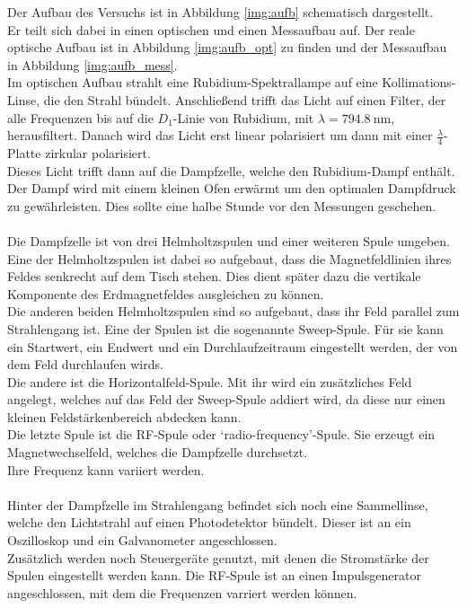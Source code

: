 \noindent
Der Aufbau des Versuchs ist in Abbildung \ref{img:aufb} schematisch dargestellt.\\
Er teilt sich dabei in einen optischen und einen Messaufbau auf. Der reale optische Aufbau ist in Abbildung
\ref{img:aufb_opt} zu finden und der Messaufbau in Abbildung \ref{img:aufb_mess}.\\
Im optischen Aufbau strahlt eine Rubidium-Spektrallampe auf eine Kollimations-Linse, die den Strahl bündelt.
Anschließend trifft das Licht auf einen Filter, der alle Frequenzen bis auf die $D_1$-Linie von Rubidium, 
mit $\lambda = \SI{794.8}{\nano\metre}$, herausfiltert. Danach wird das Licht erst linear polarisiert um dann mit einer $\frac{\lambda}{4}$-Platte zirkular polarisiert.\\
Dieses Licht trifft dann auf die Dampfzelle, welche den Rubidium-Dampf enthält. 
Der Dampf wird mit einem kleinen Ofen erwärmt um den optimalen Dampfdruck zu gewährleisten.
Dies sollte eine halbe Stunde vor den Messungen geschehen.\\\\
Die Dampfzelle ist von drei Helmholtzspulen und einer weiteren Spule umgeben.\\
Eine der Helmholtzspulen ist dabei so aufgebaut, dass die Magnetfeldlinien ihres Feldes senkrecht auf dem Tisch stehen.
Dies dient später dazu die vertikale Komponente des Erdmagnetfeldes ausgleichen zu können.\\
Die anderen beiden Helmholtzspulen sind so aufgebaut, dass ihr Feld parallel zum Strahlengang ist.
Eine der Spulen ist die sogenannte Sweep-Spule. 
Für sie kann ein Startwert, ein Endwert und ein Durchlaufzeitraum eingestellt werden, der von dem Feld durchlaufen wirds.\\
Die andere ist die Horizontalfeld-Spule. 
Mit ihr wird ein zusätzliches Feld angelegt, welches auf das Feld der Sweep-Spule addiert wird, da diese nur einen kleinen Feldstärkenbereich abdecken kann.\\
Die letzte Spule ist die RF-Spule oder \enquote*{radio-frequency}-Spule. 
Sie erzeugt ein Magnetwechselfeld, welches die Dampfzelle durchsetzt.\\
Ihre Frequenz kann variiert werden.\\\\ 
Hinter der Dampfzelle im Strahlengang befindet sich noch eine Sammellinse, welche den Lichtstrahl auf einen Photodetektor bündelt.
Dieser ist an ein Oszilloskop und ein Galvanometer angeschlossen.\\
Zusätzlich werden noch Steuergeräte genutzt, mit denen die Stromstärke der Spulen eingestellt werden kann.
Die RF-Spule ist an einen Impulsgenerator angeschlossen, mit dem die Frequenzen varriert werden können.\\


